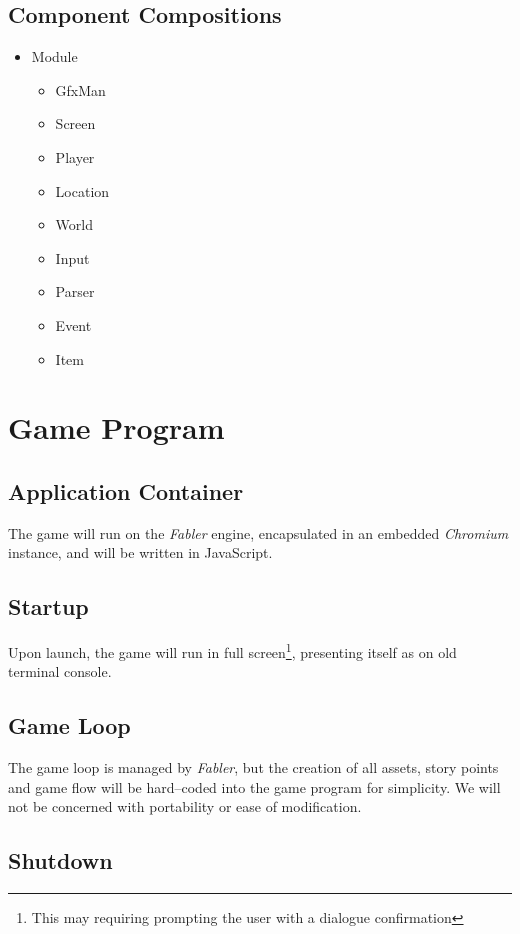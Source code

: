 \documentclass[letterpaper, twoside, 12pt]{memoir}
\begin{document}
\subsection{Component Compositions}
\begin{itemize}
\item Module
  \begin{itemize}
  \item GfxMan
  \item Screen
  \item Player
  \item Location
  \item World
  \item Input
  \item Parser
  \item Event
  \item Item
  \end{itemize}
\end{itemize}

\section{Game Program}

\subsection{Application Container}

The game will run on the \textit{Fabler} engine, encapsulated in an embedded \textit{Chromium} instance, and will be written in JavaScript.

\subsection{Startup}

Upon launch, the game will run in full screen\footnote{This may requiring prompting the user with a dialogue confirmation}, presenting itself as on old terminal console.

\subsection{Game Loop}

The game loop is managed by \textit{Fabler}, but the creation of all assets, story points and game flow will be hard--coded into the game program for simplicity. We will not be concerned with portability or ease of modification.

\subsection{Shutdown}
\end{document}
